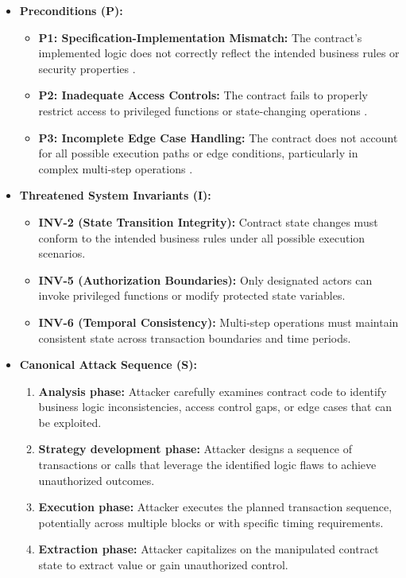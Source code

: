 \begin{itemize}
\item \textbf{Preconditions (P):}
    \begin{itemize}
    \item \textbf{P1: Specification-Implementation Mismatch:} The contract's implemented logic does not correctly reflect the intended business rules or security properties \cite{zhou2023sok}.
    \item \textbf{P2: Inadequate Access Controls:} The contract fails to properly restrict access to privileged functions or state-changing operations \cite{perez2021analysis}.
    \item \textbf{P3: Incomplete Edge Case Handling:} The contract does not account for all possible execution paths or edge conditions, particularly in complex multi-step operations \cite{praitheeshan2019systematic}.
    \end{itemize}

\item \textbf{Threatened System Invariants (I):}
    \begin{itemize}
    \item \textbf{INV-2 (State Transition Integrity):} Contract state changes must conform to the intended business rules under all possible execution scenarios.
    \item \textbf{INV-5 (Authorization Boundaries):} Only designated actors can invoke privileged functions or modify protected state variables.
    \item \textbf{INV-6 (Temporal Consistency):} Multi-step operations must maintain consistent state across transaction boundaries and time periods.
    \end{itemize}

\item \textbf{Canonical Attack Sequence (S):}
    \begin{enumerate}
    \item \textbf{Analysis phase:} Attacker carefully examines contract code to identify business logic inconsistencies, access control gaps, or edge cases that can be exploited.
    \item \textbf{Strategy development phase:} Attacker designs a sequence of transactions or calls that leverage the identified logic flaws to achieve unauthorized outcomes.
    \item \textbf{Execution phase:} Attacker executes the planned transaction sequence, potentially across multiple blocks or with specific timing requirements.
    \item \textbf{Extraction phase:} Attacker capitalizes on the manipulated contract state to extract value or gain unauthorized control.
    \end{enumerate}
\end{itemize}

